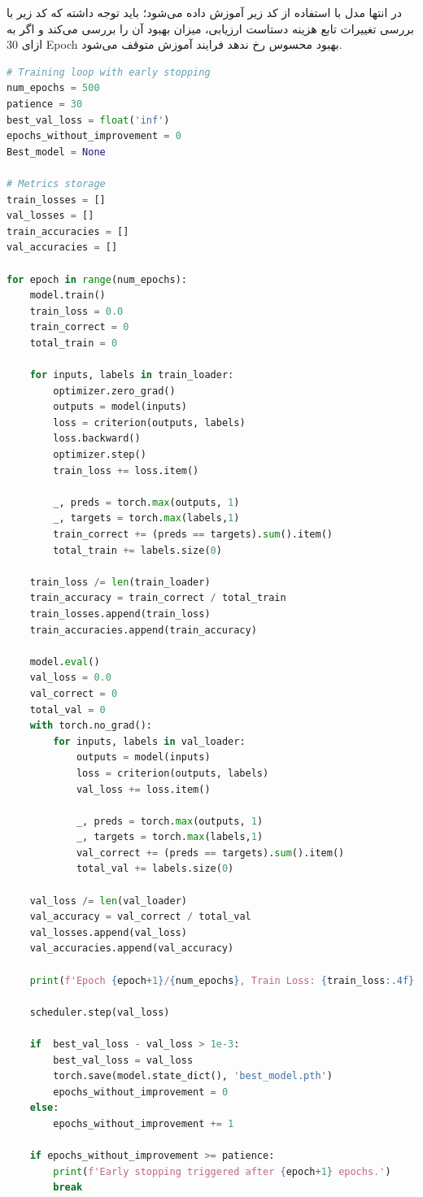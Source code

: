 \documentclass{article}
\begin{document}
در انتها مدل با استفاده از کد زیر آموزش داده می‌شود؛ باید توجه داشته که کد زیر با بررسی تغییرات تابع هزینه دستاست ارزیابی، میزان بهبود آن را بررسی می‌کند و اگر به ازای 30 
Epoch
بهبود محسوس رخ ندهد فرایند آموزش متوقف می‌شود.
\begin{LTR}
	\begin{lstlisting}[language=Python, caption=Train Loop]       
# Training loop with early stopping
num_epochs = 500
patience = 30
best_val_loss = float('inf')
epochs_without_improvement = 0
Best_model = None

# Metrics storage
train_losses = []
val_losses = []
train_accuracies = []
val_accuracies = []

for epoch in range(num_epochs):
    model.train()
    train_loss = 0.0
    train_correct = 0
    total_train = 0

    for inputs, labels in train_loader:
        optimizer.zero_grad()
        outputs = model(inputs)
        loss = criterion(outputs, labels)
        loss.backward()
        optimizer.step()
        train_loss += loss.item()

        _, preds = torch.max(outputs, 1)
        _, targets = torch.max(labels,1)
        train_correct += (preds == targets).sum().item()
        total_train += labels.size(0)

    train_loss /= len(train_loader)
    train_accuracy = train_correct / total_train
    train_losses.append(train_loss)
    train_accuracies.append(train_accuracy)

    model.eval()
    val_loss = 0.0
    val_correct = 0
    total_val = 0
    with torch.no_grad():
        for inputs, labels in val_loader:
            outputs = model(inputs)
            loss = criterion(outputs, labels)
            val_loss += loss.item()

            _, preds = torch.max(outputs, 1)
            _, targets = torch.max(labels,1)
            val_correct += (preds == targets).sum().item()
            total_val += labels.size(0)

    val_loss /= len(val_loader)
    val_accuracy = val_correct / total_val
    val_losses.append(val_loss)
    val_accuracies.append(val_accuracy)

    print(f'Epoch {epoch+1}/{num_epochs}, Train Loss: {train_loss:.4f}, Val Loss: {val_loss:.4f}, Train Accuracy: {train_accuracy:.4f}, Val Accuracy: {val_accuracy:.4f}')

    scheduler.step(val_loss)
    
    if  best_val_loss - val_loss > 1e-3:
        best_val_loss = val_loss
        torch.save(model.state_dict(), 'best_model.pth')
        epochs_without_improvement = 0
    else:
        epochs_without_improvement += 1

    if epochs_without_improvement >= patience:
        print(f'Early stopping triggered after {epoch+1} epochs.')
        break
	\end{lstlisting}
\end{LTR}         
        
\end{document}
